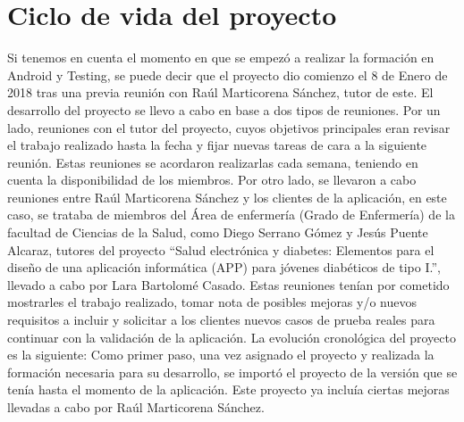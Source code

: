 \section{Ciclo de vida del proyecto}
Si tenemos en cuenta el momento en que se empezó a realizar la formación en Android y Testing, se puede decir que el proyecto dio comienzo el 8 de Enero de 2018 tras una previa reunión con Raúl Marticorena Sánchez, tutor de este.
El desarrollo del proyecto se llevo a cabo en base a dos tipos de reuniones.
Por un lado, reuniones con el tutor del proyecto, cuyos objetivos principales eran revisar el trabajo realizado hasta la fecha y fijar nuevas tareas de cara a la siguiente reunión. Estas reuniones se acordaron realizarlas cada semana, teniendo en cuenta la disponibilidad de los miembros. 
Por otro lado, se llevaron a cabo reuniones entre Raúl Marticorena Sánchez y los clientes de la aplicación, en este caso, se trataba de miembros del Área de enfermería (Grado de Enfermería) de la facultad de Ciencias de la Salud, como Diego Serrano Gómez y Jesús Puente Alcaraz, tutores del proyecto ``Salud electrónica y diabetes: Elementos para el diseño de una aplicación informática (APP) para jóvenes diabéticos de tipo I.'', llevado a cabo por Lara Bartolomé Casado. Estas reuniones tenían por cometido mostrarles el trabajo realizado, tomar nota de posibles mejoras y/o nuevos requisitos a incluir y solicitar a los clientes nuevos casos de prueba reales para continuar con la validación de la aplicación.
La evolución cronológica del proyecto es la siguiente:
Como primer paso, una vez asignado el proyecto y realizada la formación necesaria para su desarrollo, se importó el proyecto de la versión que se tenía hasta el momento de la aplicación. Este proyecto ya incluía ciertas mejoras llevadas a cabo por Raúl Marticorena Sánchez.

